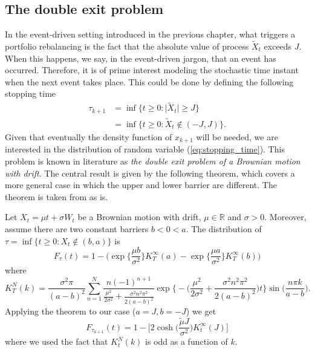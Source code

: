 \subsection{The double exit problem }
In the event-driven setting introduced in the previous chapter, what triggers a portfolio rebalancing is the fact that the absolute value of process $\widetilde{X}_t$ exceeds $J$. When this happens, we say, in the event-driven jargon, that an event has occurred. Therefore, it is of prime interest  modeling the stochastic time instant when the next event takes place. This could be done by defining the following stopping time
\begin{align}\label{eq:stopping_time}
\tau_{k+1} & = \inf\big\{t\geq 0 \colon \lvert\widetilde{X}_t\lvert\geq J \big\}\\\nonumber
& = \inf\big\{t\geq 0 \colon \widetilde{X}_t \notin (-J,J) \big\}.
\end{align}
Given that eventually the density function of $x_{k+1}$ will be needed, we are interested in the distribution of random variable (\ref{eq:stopping_time}). This problem is known in literature as \textit{the double exit problem of a Brownian motion with drift}. The central result is given by the following theorem, which covers a more general case in which the upper and lower barrier are different. The theorem is taken from \cite{Hieber2012} as is.
\begin{theorem}\label{thm:double_exit_problem}
	Let $X_t = \mu t + \sigma W_t$ be a Brownian motion with drift, $\mu \in \mathbb{R}$ and $\sigma > 0$. Moreover, assume there are two constant barriers $b<0<a$. The distribution of $\tau = \inf\big\{t\geq 0 \colon X_t \notin (b,a) \big\}$ is 
	\[
	F_{\tau}(t) = 1-\bigg(\exp\Big\{\frac{\mu b}{\sigma^2}\Big\}K_T^{\infty}(a)-\exp\Big\{\frac{\mu a}{\sigma^2}\Big\}K_T^{\infty}(b) \bigg)
	\]
	where
	\[
	K_T^N(k)= \frac{\sigma^2\pi}{(a-b)^2}\sum_{n=1}^{N}\frac{n(-1)^{n+1}}{\frac{\mu^2}{2\sigma^2}+\frac{\sigma^2n^2\pi^2}{2(a-b)^2}}\exp\bigg\{-\bigg(\frac{\mu^2}{2\sigma^2}+\frac{\sigma^2n^2\pi^2}{2(a-b)^2}\bigg)t\bigg\}\sin\Big(\frac{n\pi k}{a-b}\Big).
	\]
	Applying the theorem to our case ($a=J, b=-J$) we get 
	\begin{equation}
	F_{\tau_{k+1}}(t)=1-\bigg[2\cosh\Big(\frac{\widetilde{\mu}J}{\sigma^2}\Big)K_t^{\infty}(J)\bigg]
	\end{equation}
	where we used the fact that $K_t^N(k)$ is odd as a function of $k$.
\end{theorem}

